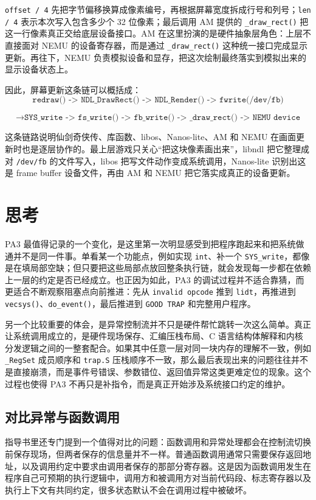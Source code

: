 \documentclass[a4paper]{article}
\begin{document}
\texttt{offset / 4} 先把字节偏移换算成像素编号，再根据屏幕宽度拆成行号和列号；\texttt{len / 4} 表示本次写入包含多少个 32 位像素；最后调用 AM 提供的 \texttt{\_draw\_rect()} 把这一行像素真正交给底层设备接口。AM 在这里扮演的是硬件抽象层角色：上层不直接面对 NEMU 的设备寄存器，而是通过 \texttt{\_draw\_rect()} 这种统一接口完成显示更新。再往下，NEMU 负责模拟设备和显存，把这次绘制最终落实到模拟出来的显示设备状态上。

因此，屏幕更新这条链可以概括成：
\[
\texttt{redraw() -> NDL\_DrawRect() -> NDL\_Render() -> fwrite(/dev/fb)}
\]

\[
\rightarrow
\texttt{SYS\_write -> fs\_write() -> fb\_write() -> \_draw\_rect() -> NEMU\ device}
\]

这条链路说明仙剑奇侠传、库函数、libos、Nanos-lite、AM 和 NEMU 在画面更新时也是逐层协作的。最上层游戏只关心“把这块像素画出来”，libndl 把它整理成对 \texttt{/dev/fb} 的文件写入，libos 把写文件动作变成系统调用，Nanos-lite 识别出这是 frame buffer 设备文件，再由 AM 和 NEMU 把它落实成真正的设备更新。

\section{思考}
PA3 最值得记录的一个变化，是这里第一次明显感受到把程序跑起来和把系统做通并不是同一件事。单看某一个功能点，例如实现 \texttt{int}、补一个 \texttt{SYS\_write}，都像是在填局部空缺；但只要把这些局部点放回整条执行链，就会发现每一步都在依赖上一层的约定是否已经成立。也正因为如此，PA3 的调试过程并不适合靠猜，而更适合不断观察阻塞点向前推进：先从 \texttt{invalid opcode} 推到 \texttt{lidt}，再推进到 \texttt{vecsys()}、\texttt{do\_event()}，最后推进到 \texttt{GOOD TRAP} 和完整用户程序。

另一个比较重要的体会，是异常控制流并不只是硬件帮忙跳转一次这么简单。真正让系统调用成立的，是硬件现场保存、汇编压栈布局、C 语言结构体解释和内核分发逻辑之间的一整套配合。如果其中任意一层对同一块内存的理解不一致，例如 \texttt{\_RegSet} 成员顺序和 \texttt{trap.S} 压栈顺序不一致，那么最后表现出来的问题往往并不是直接崩溃，而是事件号错误、参数错位、返回值异常这类更难定位的现象。这个过程也使得 PA3 不再只是补指令，而是真正开始涉及系统接口约定的维护。

\subsection{对比异常与函数调用}
指导书里还专门提到一个值得对比的问题：函数调用和异常处理都会在控制流切换前保存现场，但两者保存的信息量并不一样。普通函数调用通常只需要保存返回地址，以及调用约定中要求由调用者保存的那部分寄存器。这是因为函数调用发生在程序自己可预期的执行逻辑中，调用方和被调用方对当前代码段、标志寄存器以及执行上下文有共同约定，很多状态默认不会在调用过程中被破坏。
\end{document}
